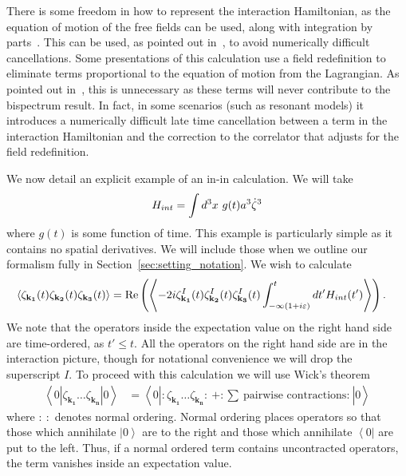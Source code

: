 There is some freedom in how to represent the interaction Hamiltonian,
as the equation of motion of the free fields can be used, along with integration by parts~\cite{rp_integ_by_parts}.
This can be used, as pointed out in~\cite{Funakoshi}, to avoid numerically difficult cancellations.
Some presentations of this calculation use a field redefinition to eliminate terms
proportional to the equation of motion from the Lagrangian.
As pointed out in~\cite{px_burrage},
this is unnecessary as these terms will never contribute to the bispectrum result.
In fact, in some scenarios (such as resonant models) it introduces a numerically difficult
late time cancellation between a term in the interaction Hamiltonian and the
correction to the correlator that adjusts for the field redefinition.




We now detail an explicit example of an in-in calculation.
We will take
\begin{align}\label{hint_example}
    H_{int}=\int d^3x~g(t) a^3{\dot{\zeta}^3}
\end{align}
where $g(t)$ is some function of time.
This example is particularly simple as it contains no spatial derivatives.
We will include those when we outline our formalism fully in Section~\ref{sec:setting_notation}.
We wish to calculate
\begin{align}\label{inin_example}
    \left<\zeta_{\mathbf{k_1}}(t)\zeta_{\mathbf{k_2}}(t)\zeta_{\mathbf{k_3}}(t)\right>&=
    \operatorname{Re}\left(\left<-2i \zeta^I_{\mathbf{k_1}}(t)\zeta^I_{\mathbf{k_2}}(t)\zeta^I_{\mathbf{k_3}}(t)
    \int_{-\infty(1+i\varepsilon)}^{t}dt'H_{int}(t')
    \right>\right).
\end{align}
We note that the operators inside the expectation value on the right hand side are
time-ordered, as $t'\leq t$.
All the operators on the right hand side are in the interaction picture, though for
notational convenience we will drop the superscript $I$.
To proceed with this calculation we will use Wick's theorem
\begin{align}\label{wick}
    \left<0\left|\zeta_{\mathbf{k_1}}\ldots\zeta_{\mathbf{k_n}}\right|0\right>
    &= \left<0\left|:\zeta_{\mathbf{k_1}}\ldots\zeta_{\mathbf{k_n}}:~+:\sum~\text{pairwise contractions:}~\right|0\right>
\end{align}
where $:~:$ denotes normal ordering. Normal ordering places operators so that those
which annihilate $\left|0\right>$ are to the right and those which annihilate
$\left<0\right|$ are put to the left. Thus, if a normal ordered term contains
uncontracted operators, the term vanishes inside an expectation value.


